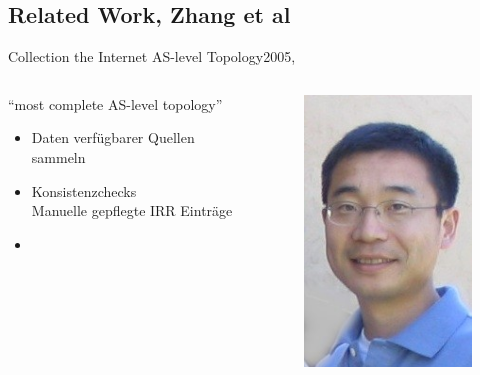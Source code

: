 \documentclass[ngerman,compress,hyperref={bookmarks}]{beamer}
\begin{document}
\subsection{Related Work, Zhang et al}
\begin{frame}{Collection the Internet AS-level Topology}{2005, \cite{Zhang:2005:CIA:1052812.1052825}}
  \begin{columns}[c]
    \begin{column}{0.5\textwidth}
      ``most complete AS-level topology''
      \begin{itemize}
        \item Daten verfügbarer Quellen sammeln
        \item Konsistenzchecks\\{\scriptsize Manuelle gepflegte IRR Einträge}
        \item
      \end{itemize}
    \end{column}
    \begin{column}{0.08\textwidth}
      \begin{figure}
        \label{zhang_et_al}
        \includegraphics[width=1\textwidth]{images/zhang_b}\\

\end{figure}
\end{column}
\end{columns}
\end{frame}
\end{document}
